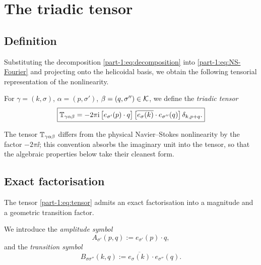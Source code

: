 \section{The triadic tensor}\label{part-1:sec:tensor}

\subsection{Definition}
\label{part-1:ssec:tensor-def}

Substituting the decomposition \eqref{part-1:eq:decomposition} into 
\eqref{part-1:eq:NS-Fourier} and projecting onto the helicoidal basis, we 
obtain the following tensorial representation of the nonlinearity.

\begin{definition}\label{part-1:def:tensor}
For $\gamma = (k,\sigma)$, $\alpha = (p,\sigma')$, 
$\beta = (q,\sigma'')\in\mathcal{K}$, we define the \emph{triadic tensor}
\begin{equation}\label{part-1:eq:tensor}
\boxed{
\mathbb{T}_{\gamma\alpha\beta}
= -2\pi\mathrm{i}\,
\bigl[e_{\sigma'}(p)\cdot q\bigr]\,
\bigl[\overline{e_\sigma(k)}\cdot e_{\sigma''}(q)\bigr]\,
\delta_{k,p+q}.
}
\end{equation}
\end{definition}

\begin{remark}\label{part-1:rem:tensor-real-form}
The tensor $\mathbb{T}_{\gamma\alpha\beta}$ differs from the physical 
Navier--Stokes nonlinearity by the factor $-2\pi\ii$; this convention 
absorbs the imaginary unit into the tensor, so that the algebraic 
properties below take their cleanest form.
\end{remark}

\subsection{Exact factorisation}
\label{part-1:ssec:factorisation}

The tensor \eqref{part-1:eq:tensor} admits an exact factorisation into a 
magnitude and a geometric transition factor.

\begin{definition}\label{part-1:def:symbols}
We introduce the \emph{amplitude symbol}
\begin{equation}\label{part-1:eq:amplitude-symbol}
A_{\sigma'}(p,q) := e_{\sigma'}(p)\cdot q,
\end{equation}
and the \emph{transition symbol}
\begin{equation}\label{part-1:eq:transition-symbol}
B_{\sigma\sigma''}(k,q) := \overline{e_\sigma(k)}\cdot e_{\sigma''}(q).
\end{equation}
\end{definition}

